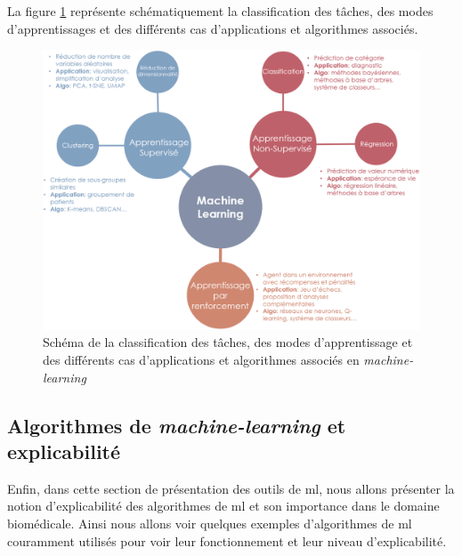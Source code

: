La figure \ref{fig:ml-landscape} représente schématiquement la classification des tâches, des modes d'apprentissages et des différents cas d'applications et algorithmes associés.
\begin{figure}[!ht]
 \centering
 \includegraphics[width=1\textwidth]{figures/ml_landscape.png}
 \caption[Schéma des méthodes de machine-learning]{Schéma de la classification des tâches, des modes d'apprentissage et des différents cas d'applications et algorithmes associés en \textit{machine-learning}}
 \label{fig:ml-landscape}
\end{figure}

\subsection{Algorithmes de \textit{machine-learning} et explicabilité}
Enfin, dans cette section de présentation des outils de \gls{ml}, nous allons présenter la notion d'explicabilité des algorithmes de \gls{ml} et son importance dans le domaine biomédicale. Ainsi nous allons voir quelques exemples d'algorithmes de \gls{ml} couramment utilisés pour voir leur fonctionnement et leur niveau d'explicabilité.

